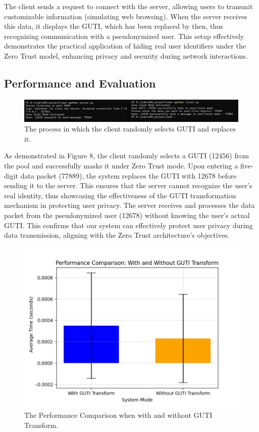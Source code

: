 \documentclass[sigplan,screen]{acmart}
\begin{document}
The client sends a request to connect with the server, allowing users to transmit customizable information (simulating web browsing). When the server receives this data, it displays the GUTI, which has been replaced by then, thus recognizing communication with a pseudonymized user. This setup effectively demonstrates the practical application of hiding real user identifiers under the Zero Trust model, enhancing privacy and security during network interactions.

\subsection{Performance and Evaluation}

\begin{figure}[htbp]
\centering
\includegraphics[width=\linewidth]{gutiCode.png}
\caption{The process in which the client randomly selects GUTI and replaces it.}
\end{figure}

As demonstrated in Figure 8, the client randomly selects a GUTI (12456) from the pool and successfully masks it under Zero Trust mode. Upon entering a five-digit data packet (77889), the system replaces the GUTI with 12678 before sending it to the server. This ensures that the server cannot recognize the user's real identity, thus showcasing the effectiveness of the GUTI transformation mechanism in protecting user privacy. The server receives and processes the data packet from the pseudonymized user (12678) without knowing the user's actual GUTI. This confirms that our system can effectively protect user privacy during data transmission, aligning with the Zero Trust architecture's objectives.

\begin{figure}[htbp]
\centering
\includegraphics[width=\linewidth]{performanceComparison.jpg}
\caption{The Performance Comparison when with and without GUTI Transform.}
\end{figure}
\end{document}
